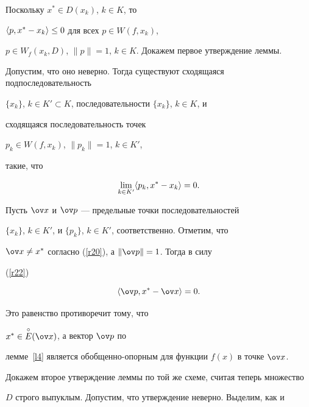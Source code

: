 \begin{pf}


Поскольку $x^*\in D(x_k)$, $k\in K$, то


$\langle p, x^*-x_k \rangle \le 0$ для всех $p\in W(f, x_k)$,


$p\in W_f(x_k,D)$, $\|p\|=1$, $k\in K$. Докажем первое утверждение леммы.


Допустим, что оно неверно. Тогда существуют сходящаяся подпоследовательность


$\{x_k\}$, $k\in K'\subset K$, последовательности $\{x_k\}$, $k\in K$, и


сходящаяся последовательность точек


$p_k\in W(f, x_k)$, $\|p_k\|=1$, $k\in K'$,


такие, что




\begin{equation} \label{r22}


\lim_{k\in K'} \la p_k, x^*-x_k \ra =0.


\end{equation}


%


Пусть $\ov x$ и $\ov p$ --- предельные точки последовательностей


$\{x_k\}$, $k\in K'$, и $\{p_k\}$, $k\in K'$, соответственно. Отметим, что


$\ov x\ne x^*$ согласно (\ref{r20}), а $\|\ov p\|=1$. Тогда в силу


(\ref{r22})




\begin{equation} \label{r23}


\la \ov p, x^*-\ov x \ra =0.


\end{equation}


%


Это равенство противоречит тому, что


$x^* \in \overset{\circ}{E}{}(\ov x)$, а вектор $\ov p$ по


лемме~\ref{l4} является обобщенно-опорным для функции $f(x)$ в точке $\ov


x$.





Докажем второе утверждение леммы по той же схеме, считая теперь множество


$D$ строго выпуклым. Допустим, что утверждение неверно. Выделим, как и



\end{pf}
